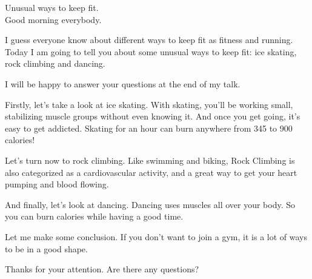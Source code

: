 \documentclass[a4paper,24pt]{article}
\begin{document}
\newpage
Unusual ways to keep fit.\\

Good morning everybody.


I guess everyone know about different ways to keep fit as fitness and running.
Today I am going to tell you about some unusual ways to keep fit: ice skating, rock climbing and dancing.


I will be happy to answer your questions at the end of my talk.


Firstly, let’s take a look at ice skating.
With skating, you’ll be working small, stabilizing muscle groups without even knowing it. And once you get going, it’s easy to get addicted. Skating for an hour can burn anywhere from 345 to 900 calories!


Let’s turn now to rock climbing.
Like swimming and biking, Rock Climbing is also categorized as a cardiovascular activity, and a great way to get your heart pumping and blood flowing.


And finally, let’s look at dancing.
Dancing uses muscles all over your body.
So you can burn calories while having a good time.


Let me make some conclusion. If you don’t want to join a gym, it is a lot of ways to be in a good shape.


Thanks for your attention.
Are there any questions?
\end{document}
